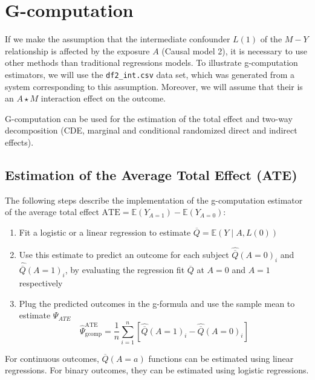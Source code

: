 \documentclass[
]{book}
\begin{document}
\hypertarget{chap_gcomp}{%
\chapter{G-computation}\label{chap_gcomp}}

If we make the assumption that the intermediate confounder \(L(1)\) of the \(M-Y\) relationship is affected by the exposure \(A\) (Causal model 2), it is necessary to use other methods than traditional regressions models. To illustrate g-computation estimators, we will use the \texttt{df2\_int.csv} data set, which was generated from a system corresponding to this assumption. Moreover, we will assume that their is an \(A \star M\) interaction effect on the outcome.

G-computation can be used for the estimation of the total effect and two-way decomposition (CDE, marginal and conditional randomized direct and indirect effects).

\hypertarget{estimation-of-the-average-total-effect-ate-1}{%
\section{Estimation of the Average Total Effect (ATE)}\label{estimation-of-the-average-total-effect-ate-1}}

The following steps describe the implementation of the g-computation estimator of the average total effect \(\text{ATE} = \mathbb{E}(Y_{A=1}) - \mathbb{E}(Y_{A=0})\):

\begin{enumerate}
\def\labelenumi{\arabic{enumi}.}
\item
  Fit a logistic or a linear regression to estimate \(\overline{Q} = \mathbb{E}(Y \mid A, L(0))\)
\item
  Use this estimate to predict an outcome for each subject \(\hat{\overline{Q}}(A=0)_i\) and \(\hat{\overline{Q}}(A=1)_i\), by evaluating the regression fit \(\overline{Q}\) at \(A=0\) and \(A=1\) respectively
\item
  Plug the predicted outcomes in the g-formula and use the sample mean to estimate \(\Psi_{ATE}\)
  \begin{equation}
  \hat{\Psi}^{\text{ATE}}_{\text{gcomp}} = \frac{1}{n} \sum_{i=1}^n \left[ \hat{\overline{Q}}(A=1)_i - \hat{\overline{Q}}(A=0)_i \right]
  \end{equation}
\end{enumerate}

For continuous outcomes, \(\overline{Q}(A=a)\) functions can be estimated using linear regressions. For binary outcomes, they can be estimated using logistic regressions.
\end{document}
